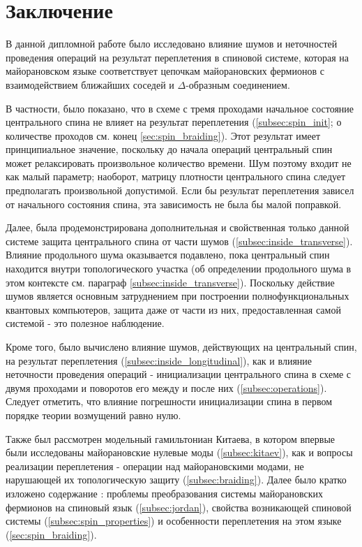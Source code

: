 \documentclass[a4paper,12pt]{article}
\theoremstyle{plain} %
\theoremstyle{definition} %
\theoremstyle{remark} %
\begin{document}
\pagebreak

\section{Заключение}

В данной дипломной работе было исследовано влияние шумов и неточностей проведения операций на результат переплетения в спиновой системе, которая на майорановском языке соответствует цепочкам майорановских фермионов с взаимодействием ближайших соседей и $\Delta$-образным соединением.

В частности, было показано, что в схеме с тремя проходами начальное состояние центрального спина не влияет на результат переплетения (\ref{subsec:spin_init}; о количестве проходов см. конец \ref{sec:spin_braiding}). Этот результат имеет принципиальное значение, поскольку до начала операций центральный спин может релаксировать произвольное количество времени. Шум поэтому входит не как малый параметр; наоборот, матрицу плотности центрального спина следует предполагать произвольной допустимой. Если бы результат переплетения зависел от начального состояния спина, эта зависимость не была бы малой поправкой.
 
Далее, была продемонстрирована дополнительная и свойственная только данной системе защита центрального спина от части шумов (\ref{subsec:inside_transverse}). Влияние продольного шума оказывается подавлено, пока центральный спин находится внутри топологического участка (об определении продольного шума в этом контексте см. параграф \ref{subsec:inside_transverse}). Поскольку действие шумов является основным затруднением при построении полнофункциональных квантовых компьютеров, защита даже от части из них, предоставленная самой системой - это полезное наблюдение.

Кроме того, было вычислено влияние шумов, действующих на центральный спин, на результат переплетения (\ref{subsec:inside_longitudinal}), как и влияние неточности проведения операций - инициализации центрального спина в схеме с двумя проходами и поворотов его между и после них (\ref{subsec:operations}). Следует отметить, что влияние погрешности инициализации спина в первом порядке теории возмущений равно нулю.

Также был рассмотрен модельный гамильтониан Китаева, в котором впервые были исследованы майорановские нулевые моды (\ref{subsec:kitaev}), как и вопросы реализации переплетения - операции над майорановскими модами, не нарушающей их топологическую защиту (\ref{subsec:braiding}). Далее было кратко изложено содержание \cite{main}: проблемы преобразования системы майорановских фермионов на спиновый язык (\ref{subsec:jordan}), свойства возникающей спиновой системы (\ref{subsec:spin_properties}) и особенности переплетения на этом языке (\ref{sec:spin_braiding}).
\end{document}
